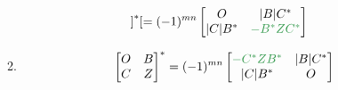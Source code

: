 \documentclass[a4paper,12pt]{article}
\begin{document}
\begin{enumerate}
\begin{enumerate}
\[\begin{bmatrix}
                \end{bmatrix}^{*}
                = (-1)^{mn}\begin{bmatrix}
                               O        & |B|C^{*}                               \\
                               |C|B^{*} & \color[rgb]{0.2, 0.6, 0.3}{-B^{*}ZC^*}
                \end{bmatrix}
            \]
            \item
            \[
                \begin{bmatrix}
                    O & B \\
                    C & Z
                \end{bmatrix}^{*}
                = (-1)^{mn}\begin{bmatrix}
                               \color[rgb]{0.2, 0.6, 0.3}{-C^{*}ZB^*} & |B|C^{*} \\
                               |C|B^{*}                               & O
                \end{bmatrix}
            \]
        \end{enumerate}
    \end{enumerate}
\end{document}
